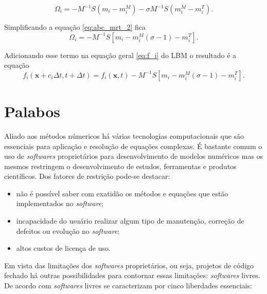\begin{equation}
  \Omega_{i} = -\textbf{$M$}^{-1}\textbf{$S$}(m_{i} - m_{i}^{M}) - 
  \sigma\textbf{$M$}^{-1}\textbf{$S$}(m_{i}^{M} - m_{i}^{T}).
  \label{eq:abc_mrt_2}
\end{equation}

Simplificando a equação \ref{eq:abc_mrt_2} fica
\begin{equation}
  \Omega_{i} = -\textbf{$M$}^{-1}\textbf{$S$}[m_{i} - m_{i}^{M}(\sigma - 1) - m_{i}^{T}].
  \label{eq:abc_mrt_3}
\end{equation}

Adicionando esse termo na equação geral \ref{eq:f_i} do LBM o resultado é a equação
\begin{equation}
  f_{i}(\textbf{x} + c_{i}\Delta t, t + \Delta t) = f_{i}(\textbf{x}, t) -\textbf{$M$}^{-1}\textbf{$S$}[m_{i} - m_{i}^{M}(\sigma - 1) - m_{i}^{T}].
  \label{eq:abc_mrt_4}  
\end{equation}

\section{Palabos}

Aliado aos métodos númericos há várias tecnologias computacionais que são essenciais para aplicação e resolução de equações complexas. É bastante comum o uso de \textit{softwares} proprietários para desenvolvimento de modelos numéricos mas os mesmos restringem o desenvolvimento de estudos, ferramentas e produtos científicos. Dos fatores de restrição pode-se destacar:

\begin{itemize}
  \item não é possível saber com exatidão os métodos e equações que estão implementados no \textit{software};
  \item incapacidade do usuário realizar algum tipo de manutenção, correção de defeitos ou evolução no \textit{software};
  \item altos custos de licença de uso. 
\end{itemize}

Em vista das limitações dos \textit{softwares} proprietários, ou seja, projetos de código fechado há outras possibilidades para contornar essas limitações: \textit{softwares} livres. De acordo com  \textit{softwares} livres se caracterizam por cinco liberdades essenciais:

